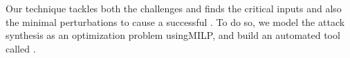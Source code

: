                                                           



Our technique tackles both the challenges and finds the critical inputs and also the minimal perturbations to cause a successful \attack. To do so, we model the attack synthesis as an optimization problem using\ac{MILP}, and build an automated tool called \tool. %

